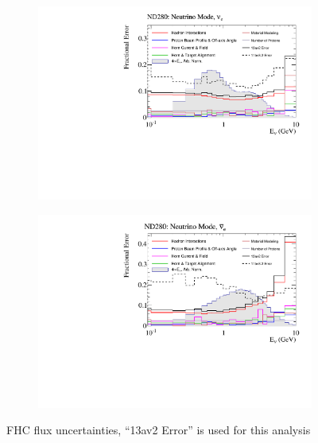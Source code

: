 \begin{figure}[h]
	\begin{subfigure}[t]{0.42\textwidth}
		\includegraphics[width=\textwidth, trim={0mm 0mm 0mm 0mm}, clip,page=1]{figures/flux/total_err_nd5_numode_nue}
	\end{subfigure}
	\begin{subfigure}[t]{0.42\textwidth}
		\includegraphics[width=\textwidth, trim={0mm 0mm 0mm 0mm}, clip,page=1]{figures/flux/total_err_nd5_numode_nueb}
	\end{subfigure}
	\caption{FHC flux uncertainties, ``13av2 Error'' is used for this analysis}
	\label{fig:flux_uncert_fhc}
\end{figure}

